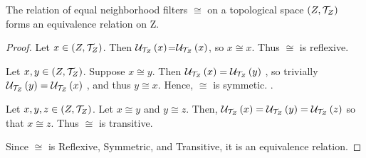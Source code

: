 
\begin{prop}[\RelationOfEqualNeighborhoodFilters]
    \label{prop:EqualNeighborhoodFiltersEquivalenceRelation}
    
    The relation of equal neighborhood filters $\cong$ on a topological space $(Z,\mathcal{T}_Z)$ forms an equivalence relation on Z. 
    \begin{proof}
        
        Let $x \in (Z,\mathcal{T}_Z)$. 
        Then $\mathcal{U}_{\mathcal{T}_{Z}}\left( x\right)$=$\mathcal{U}_{\mathcal{T}_{Z}}\left( x\right)$, so $x \cong x$.
        Thus $\cong$ is reflexive. 
        
        Let $x,y \in (Z,\mathcal{T}_Z)$. 
        Suppose $x \cong y$. 
        Then  $\mathcal{U}_{\mathcal{T}_{Z}}\left( x\right) = \mathcal{U}_{\mathcal{T}_{Z}}\left( y\right)$
        , so trivially  $\mathcal{U}_{\mathcal{T}_{Z}}\left( y\right) =\mathcal{U}_{\mathcal{T}_{Z}}\left( x\right)$
        , and thus $y \cong x$.
        Hence, $\cong$ is symmetic. . 
        
        Let $x,y,z \in (Z,\mathcal{T}_Z)$.
        Let $x \cong y$ and $y \cong z$. 
        Then, 
         $\mathcal{U}_{\mathcal{T}_{Z}}\left( x\right)= \mathcal{U}_{\mathcal{T}_{Z}}\left( y\right) =  \mathcal{U}_{\mathcal{T}_{Z}}\left( z\right)$
         so that $x \cong z$.
         Thus $\cong$ is transitive. 
         
         Since $\cong$ is Reflexive, Symmetric, and Transitive, it is an equivalence relation. 
        
    \end{proof}
\end{prop}
